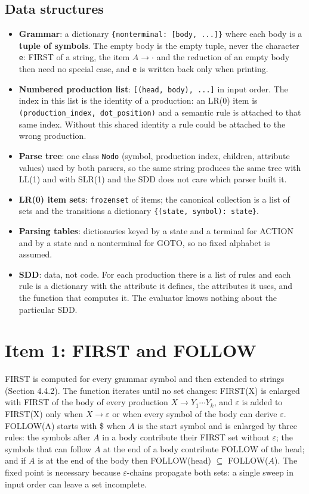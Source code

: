 \documentclass[11pt,letterpaper]{article}
\newcommand{\nt}[1]{\texttt{#1}}
\begin{document}
\subsection{Data structures}

\begin{itemize}[leftmargin=1.1em,itemsep=2pt]
\item \textbf{Grammar}: a dictionary \nt{\{nonterminal: [body, ...]\}} where each body is a
\textbf{tuple of symbols}. The empty body is the empty tuple, never the character \nt{e}: FIRST of
a string, the item $A \to \cdot$ and the reduction of an empty body then need no special case, and
\nt{e} is written back only when printing.
\item \textbf{Numbered production list}: \nt{[(head, body), ...]} in input order. The index in this
list is the identity of a production: an LR(0) item is \nt{(production\_index, dot\_position)} and a
semantic rule is attached to that same index. Without this shared identity a rule could be attached
to the wrong production.
\item \textbf{Parse tree}: one class \nt{Nodo} (symbol, production index, children, attribute values)
used by both parsers, so the same string produces the same tree with LL(1) and with SLR(1) and the
SDD does not care which parser built it.
\item \textbf{LR(0) item sets}: \nt{frozenset} of items; the canonical collection is a list of sets
and the transitions a dictionary \nt{\{(state, symbol): state\}}.
\item \textbf{Parsing tables}: dictionaries keyed by a state and a terminal for ACTION and by a
state and a nonterminal for GOTO, so no fixed alphabet is assumed.
\item \textbf{SDD}: data, not code. For each production there is a list of rules and each rule is a
dictionary with the attribute it defines, the attributes it uses, and the function that computes
it. The evaluator knows nothing about the particular SDD.
\end{itemize}

\section{Item 1: FIRST and FOLLOW}

FIRST is computed for every grammar symbol and then extended to strings (Section 4.4.2). The
function iterates until no set changes: FIRST(X) is enlarged with FIRST of the body of every
production $X \to Y_1\cdots Y_k$, and $\varepsilon$ is added to FIRST(X) only when $X \to
\varepsilon$ or when every symbol of the body can derive $\varepsilon$. FOLLOW(A) starts with \$ when
$A$ is the start symbol and is enlarged by three rules: the symbols after $A$ in a body contribute
their FIRST set without $\varepsilon$; the symbols that can follow $A$ at the end of a body
contribute FOLLOW of the head; and if $A$ is at the end of the body then FOLLOW(head) $\subseteq$
FOLLOW($A$). The fixed point is necessary because $\varepsilon$-chains propagate both sets: a single
sweep in input order can leave a set incomplete.
\end{document}
